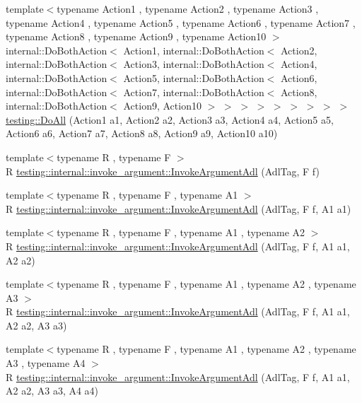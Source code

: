 \begin{DoxyCompactItemize}
\item 
{\footnotesize template$<$typename Action1 , typename Action2 , typename Action3 , typename Action4 , typename Action5 , typename Action6 , typename Action7 , typename Action8 , typename Action9 , typename Action10 $>$ }\\internal\+::\+Do\+Both\+Action$<$ Action1, internal\+::\+Do\+Both\+Action$<$ Action2, internal\+::\+Do\+Both\+Action$<$ Action3, internal\+::\+Do\+Both\+Action$<$ Action4, internal\+::\+Do\+Both\+Action$<$ Action5, internal\+::\+Do\+Both\+Action$<$ Action6, internal\+::\+Do\+Both\+Action$<$ Action7, internal\+::\+Do\+Both\+Action$<$ Action8, internal\+::\+Do\+Both\+Action$<$ Action9, Action10 $>$ $>$ $>$ $>$ $>$ $>$ $>$ $>$ $>$ \hyperlink{namespacetesting_a79ac222c485c7aa0a1774bee17dadb10}{testing\+::\+Do\+All} (Action1 a1, Action2 a2, Action3 a3, Action4 a4, Action5 a5, Action6 a6, Action7 a7, Action8 a8, Action9 a9, Action10 a10)
\item 
{\footnotesize template$<$typename R , typename F $>$ }\\R \hyperlink{namespacetesting_1_1internal_1_1invoke__argument_a003f0228357c54422037bd3b448b355a}{testing\+::internal\+::invoke\+\_\+argument\+::\+Invoke\+Argument\+Adl} (Adl\+Tag, F f)
\item 
{\footnotesize template$<$typename R , typename F , typename A1 $>$ }\\R \hyperlink{namespacetesting_1_1internal_1_1invoke__argument_af07db25fc1b7486fb991495863bf1ab8}{testing\+::internal\+::invoke\+\_\+argument\+::\+Invoke\+Argument\+Adl} (Adl\+Tag, F f, A1 a1)
\item 
{\footnotesize template$<$typename R , typename F , typename A1 , typename A2 $>$ }\\R \hyperlink{namespacetesting_1_1internal_1_1invoke__argument_afe4a6811c2bcd0c6c51194b95e224f73}{testing\+::internal\+::invoke\+\_\+argument\+::\+Invoke\+Argument\+Adl} (Adl\+Tag, F f, A1 a1, A2 a2)
\item 
{\footnotesize template$<$typename R , typename F , typename A1 , typename A2 , typename A3 $>$ }\\R \hyperlink{namespacetesting_1_1internal_1_1invoke__argument_ae5e7bcffcae6a29e9c66298ead5ee91b}{testing\+::internal\+::invoke\+\_\+argument\+::\+Invoke\+Argument\+Adl} (Adl\+Tag, F f, A1 a1, A2 a2, A3 a3)
\item 
{\footnotesize template$<$typename R , typename F , typename A1 , typename A2 , typename A3 , typename A4 $>$ }\\R \hyperlink{namespacetesting_1_1internal_1_1invoke__argument_aace931066a0efe189d7a0c69f06b74ec}{testing\+::internal\+::invoke\+\_\+argument\+::\+Invoke\+Argument\+Adl} (Adl\+Tag, F f, A1 a1, A2 a2, A3 a3, A4 a4)

\end{DoxyCompactItemize}
